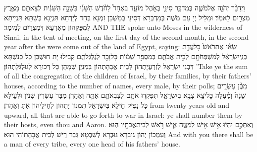 {וַיְדַבֵּ֨ר יְהֹוָ֧ה אֶל\maqqaf מֹשֶׁ֛ה בְּמִדְבַּ֥ר סִינַ֖י בְּאֹ֣הֶל מוֹעֵ֑ד בְּאֶחָד֩ לַחֹ֨דֶשׁ הַשֵּׁנִ֜י בַּשָּׁנָ֣ה הַשֵּׁנִ֗ית לְצֵאתָ֛ם מֵאֶ֥רֶץ מִצְרַ֖יִם לֵאמֹֽר׃}
{וּמַלֵּיל יְיָ עִם מֹשֶׁה בְּמַדְבְּרָא דְּסִינַי בְּמַשְׁכַּן זִמְנָא בְּחַד לְיַרְחָא תִּנְיָנָא בְּשַׁתָּא תִּנְיֵיתָא לְמִפַּקְהוֹן מֵאַרְעָא דְּמִצְרַיִם לְמֵימַר׃}
{AND THE \lord\space spoke unto Moses in the wilderness of Sinai, in the tent of meeting, on the first day of the second month, in the second year after the were come out of the land of Egypt, saying:}{}
{שְׂא֗וּ אֶת\maqqaf רֹאשׁ֙ כׇּל\maqqaf עֲדַ֣ת בְּנֵֽי\maqqaf יִשְׂרָאֵ֔ל לְמִשְׁפְּחֹתָ֖ם לְבֵ֣ית אֲבֹתָ֑ם בְּמִסְפַּ֣ר שֵׁמ֔וֹת כׇּל\maqqaf זָכָ֖ר לְגֻלְגְּלֹתָֽם׃}
{קַבִּילוּ יָת חוּשְׁבַּן כָּל כְּנִשְׁתָּא דִּבְנֵי יִשְׂרָאֵל לְזַרְעֲיָתְהוֹן לְבֵית אֲבָהָתְהוֹן בְּמִנְיַן שְׁמָהָן כָּל דְּכוּרָא לְגוּלְגְּלָתְהוֹן׃}
{’Take ye the sum of all the congregation of the children of Israel, by their families, by their fathers’ houses, according to the number of names, every male, by their polls;}{}
{מִבֶּ֨ן עֶשְׂרִ֤ים שָׁנָה֙ וָמַ֔עְלָה כׇּל\maqqaf יֹצֵ֥א צָבָ֖א בְּיִשְׂרָאֵ֑ל תִּפְקְד֥וּ אֹתָ֛ם לְצִבְאֹתָ֖ם אַתָּ֥ה וְאַהֲרֹֽן׃}
{מִבַּר עֶשְׂרִין שְׁנִין וּלְעֵילָא כָּל נָפֵיק חֵילָא בְּיִשְׂרָאֵל תִּמְנוֹן יָתְהוֹן לְחֵילֵיהוֹן אַתְּ וְאַהֲרֹן׃}
{from twenty years old and upward, all that are able to go forth to war in Israel: ye shall number them by their hosts, even thou and Aaron.}{}
{וְאִתְּכֶ֣ם יִהְי֔וּ אִ֥ישׁ אִ֖ישׁ לַמַּטֶּ֑ה אִ֛ישׁ רֹ֥אשׁ לְבֵית\maqqaf אֲבֹתָ֖יו הֽוּא׃}
{וְעִמְּכוֹן יְהוֹן גּוּבְרָא גּוּבְרָא לְשִׁבְטָא גְּבַר רֵישׁ לְבֵית אֲבָהָתוֹהִי הוּא׃}
{And with you there shall be a man of every tribe, every one head of his fathers’ house.}{}
